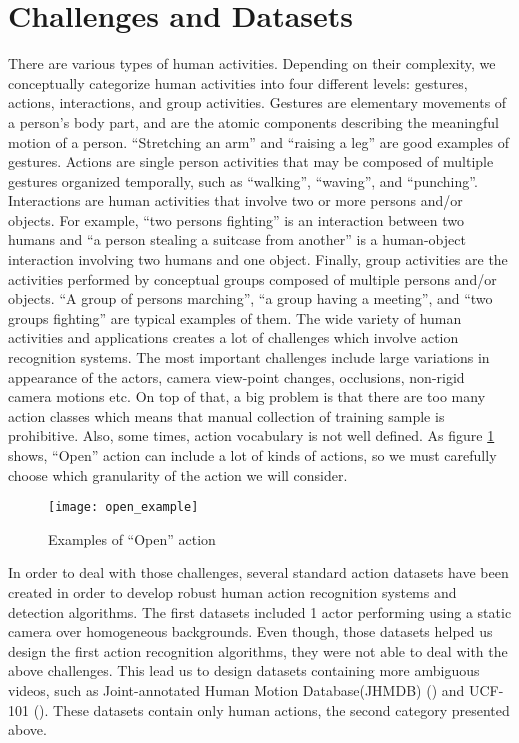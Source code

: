 \section{Challenges and Datasets}
There are various types of human activities. Depending on their complexity, we conceptually categorize human activities into four different
levels: gestures, actions, interactions, and group activities. Gestures are elementary movements of a person’s body part, and are the atomic
components describing the meaningful motion of a person. ``Stretching an arm'' and ``raising a leg'' are good examples of gestures.
Actions are single person activities that may be composed of multiple gestures organized temporally, such as ``walking'', ``waving'', and
``punching''. Interactions are human activities that involve two or more persons and/or objects. For example, ``two persons fighting'' is
an interaction between two humans and ``a person stealing a suitcase from another'' is a human-object interaction involving two humans and one
object. Finally, group activities are the activities performed by conceptual groups composed of multiple persons and/or objects. ``A group of persons marching'', ``a group having a meeting'', and ``two groups fighting'' are typical examples of them.
The wide variety of human activities and applications creates a lot of challenges which involve action recognition systems.
The most important challenges include large variations in appearance of the actors, camera view-point changes, occlusions,
non-rigid camera motions etc. On top of that, a big problem is that there are too many action classes which means
that manual collection of training sample is prohibitive. Also, some times, action vocabulary is not well defined.
As figure \ref{fig:open_example} shows, ``Open'' action can include a lot of kinds of actions, so we must carefully
choose which granularity of the action we will consider.

\begin{figure}[h]
  \centering
  \texttt{[image: open\_example]}
  \caption{Examples of ``Open'' action}
  \label{fig:open_example}

\end{figure}

In order to deal with those challenges, several standard action datasets have been created in order to develop
robust human action recognition systems and detection algorithms.
The first datasets included 1 actor performing using a static camera over homogeneous backgrounds.
Even though, those datasets helped us design the first action recognition algorithms, they were not able to deal with the above
challenges.
This lead us to design datasets containing more ambiguous videos, such as Joint-annotated Human Motion Database(JHMDB) (\cite{Kuehne11})
and UCF-101 (\cite{soomro2012ucf101}). These datasets contain only human actions, the second category presented above.

